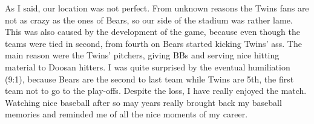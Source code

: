 \begin{post}
\begin{content}
As I said, our location was not perfect. From unknown reasons the Twins fans are not as crazy as the ones of Bears, so our side of the stadium was rather lame. This was also caused by the development of the game, because even though the teams were tied in second, from fourth on Bears started kicking Twins' ass. The main reason were the Twins' pitchers, giving BBs and serving nice hitting material to Doosan hitters. I was quite surprised by the eventual humiliation (9:1), because Bears are the second to last team while Twins are 5th, the first team not to go to the play-offs. Despite the loss, I have really enjoyed the match. Watching nice baseball after so may years really brought back my baseball memories and reminded me of all the nice moments of my career.

\begin{figure}[h]
\centering
{}
\end{figure}



\end{content}
\end{post}
